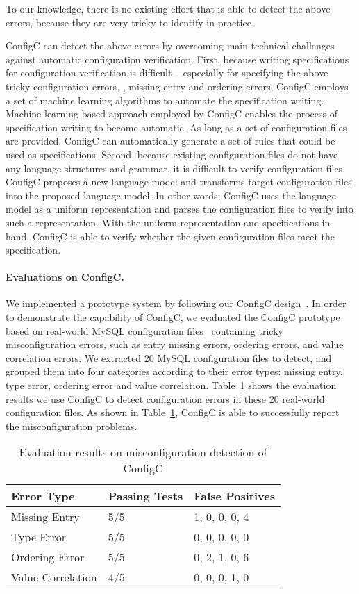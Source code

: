 To our knowledge, there is no existing effort that is able to detect
the above errors, because they are very tricky to identify in
practice.

ConfigC can detect the above errors by overcoming 
main technical challenges against automatic configuration verification.
First, because writing specifications for configuration verification
is difficult -- especially for specifying the above
tricky configuration errors, \eg, missing entry and ordering errors,
ConfigC employs a set of machine learning algorithms to
automate the specification writing. Machine learning based approach
employed by ConfigC enables the process of specification writing to become
automatic. As long as a set of configuration files are provided,
ConfigC can automatically generate a set of rules that could be used
as specifications.
Second, because existing configuration files do not have any language
structures and grammar, it is difficult to verify configuration files.
ConfigC proposes a new language model and transforms target configuration
files into the proposed language model. In other words, ConfigC uses
the language model as a uniform representation and parses the 
configuration files to verify into such a representation.
With the uniform representation and specifications in hand,
ConfigC is able to verify whether the given configuration files
meet the specification.

\paragraph{Evaluations on ConfigC.}
We implemented a prototype system by following 
our ConfigC design~\cite{santolucitoCAV}.
In order to demonstrate the capability of ConfigC,
we evaluated the ConfigC prototype based on real-world
MySQL configuration files~\cite{configdataset} 
containing tricky misconfiguration errors,
such as entry missing errors, ordering errors, and
value correlation errors.
We extracted 20 MySQL configuration files to detect, 
and grouped them into four categories according to their
error types: missing entry, type error, ordering error
and value correlation.
Table~\ref{table:res} shows the evaluation results we use
ConfigC to detect configuration errors in these 20 real-world
configuration files.
As shown in Table~\ref{table:res},
ConfigC is able to successfully report the misconfiguration problems.

\begin{table}[h]
\centering
\caption{Evaluation results on misconfiguration detection of ConfigC}
\label{table:res}
\begin{tabular}{|l|l|l|}
\hline
Error Type       & Passing Tests & False Positives  \\ 
\hline
\hline
Missing Entry      & 5/5           & 1, 0, 0, 0, 4        \\ \hline
Type Error         & 5/5           & 0, 0, 0, 0, 0          \\ \hline
Ordering Error     & 5/5           & 0, 2, 1, 0, 6       \\ \hline
Value Correlation  & 4/5           & 0, 0, 0, 1, 0        \\ 
\hline
\end{tabular}
\end{table}

